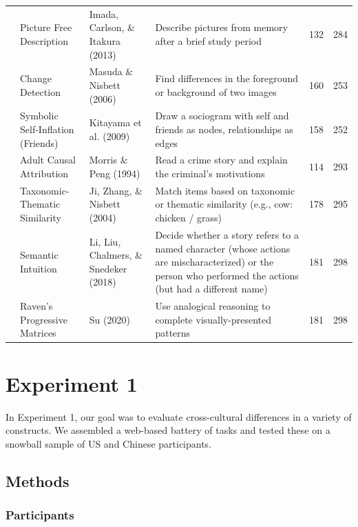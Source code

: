 \documentclass[
  man,floatsintext]{apa6}
\begin{document}
\begin{longtable}{l p{1.2in} p{1.4in} p{1.4in} p{.2in} p{.2in}}
& Picture Free Description & Imada, Carlson, \& Itakura (2013) & Describe pictures from memory after a brief study period &  132 &  284\\

& Change Detection & Masuda \& Nisbett (2006) & Find differences in the foreground or background of two images &  160 &  253\\

& Symbolic Self-Inflation (Friends) & Kitayama et al. (2009) & Draw a sociogram with self and friends as nodes, relationships as edges &  158 &  252\\

& Adult Causal Attribution & Morris \& Peng (1994) & Read a crime story and explain the criminal’s motivations &  114 &  293\\

& Taxonomic-Thematic Similarity & Ji, Zhang, \& Nisbett (2004) & Match items based on taxonomic or thematic similarity (e.g., cow: chicken / grass) & 178 &  295\\

& Semantic Intuition & Li, Liu, Chalmers, \& Snedeker (2018) & Decide whether a story refers to a named character (whose actions are mischaracterized) or the person who performed the actions (but had a different name) &  181 &  298\\

& Raven's Progressive Matrices & Su (2020) & Use analogical reasoning to complete visually-presented patterns &  181 &  298\\
    \hline
    \end{longtable}

\hypertarget{experiment-1}{%
\section{Experiment 1}\label{experiment-1}}

In Experiment 1, our goal was to evaluate cross-cultural differences in a variety of constructs. We assembled a web-based battery of tasks and tested these on a snowball sample of US and Chinese participants.

\hypertarget{methods}{%
\subsection{Methods}\label{methods}}

\hypertarget{participants}{%
\subsubsection{Participants}\label{participants}}
\end{document}

